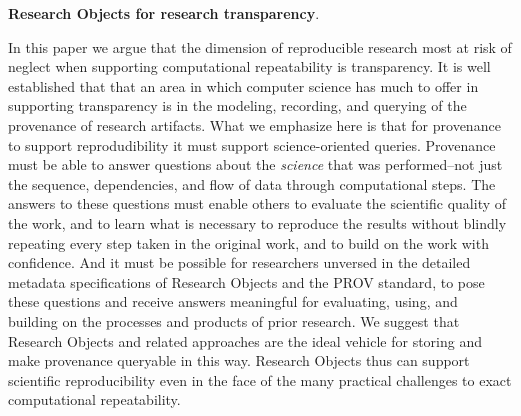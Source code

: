 \textbf{Research Objects for research transparency}.

In this paper we argue that the dimension of reproducible research most at risk of neglect when supporting computational
	repeatability is transparency.
It is well established that that an area in which computer science has much to offer in supporting transparency is in the
	modeling, recording, and querying of the provenance of research artifacts.
What we emphasize here is that for provenance to support reprodudibility it must support science-oriented queries.
Provenance must be able to answer questions about the \emph{science} that was performed--not just the 
	sequence, dependencies, and flow of data through computational steps.
The answers to these questions must enable others to evaluate the scientific quality of the work, and to learn what is necessary to 
	reproduce the results without blindly repeating every step taken in the original work, and to build on the work
	with confidence.
And it must be possible for researchers unversed in the detailed metadata specifications of Research Objects and the PROV standard,
	to pose these questions and receive answers meaningful for evaluating, using, and building on the
	processes and products of prior research.
We suggest that Research Objects and related approaches are the ideal vehicle for storing and make provenance queryable
	in this way.
Research Objects thus can support scientific reproducibility even in the face of the many practical challenges to exact 
	computational repeatability.
